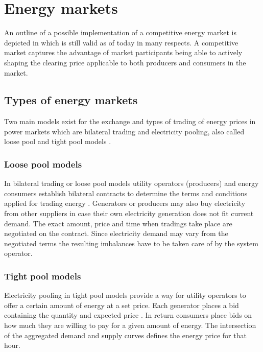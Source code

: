 

\section{Energy markets}


An outline of a possible implementation of a competitive energy market is depicted in \cite{hogan1993competitive} which is still valid as of today in many respects. A competitive market captures the advantage of market participants being able to actively shaping the clearing price applicable to both producers and consumers in the market. 




\subsection{Types of energy markets}

Two main models exist for the exchange and types of trading of energy prices in power markets which are bilateral trading and electricity pooling, also called loose pool and tight pool models \cite{onaiwu2009does,hogan1997reshaping,barroso2005classification,reston2012short}.

\subsubsection{Loose pool models}

In bilateral trading or loose pool models utility operators (producers) and energy consumers establish bilateral contracts to determine the terms and conditions applied for trading energy \cite{onaiwu2009does,kalverboer2001electricity}. Generators or producers may also buy electricity from other suppliers in case their own electricity generation does not fit current demand. The exact amount, price and time when tradings take place are negotiated on the contract. Since electricity demand may vary from the negotiated terms the resulting imbalances have to be taken care of by the system operator. 

\subsubsection{Tight pool models}

Electricity pooling in tight pool models provide a way for utility operators to offer a certain amount of energy at a set price. Each generator places a bid containing the quantity and expected price \cite{barroso2005classification}. In return consumers place bids on how much they are willing to pay for a given amount of energy. The intersection of the aggregated demand and supply curves defines the energy price for that hour. 

